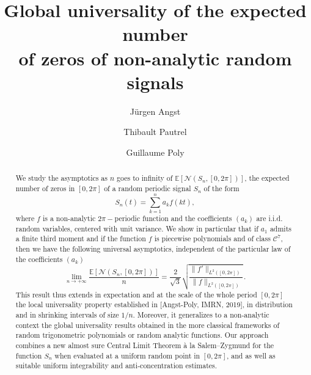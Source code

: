 \documentclass{svproc}
\newcommand \Esp {\mathbb{E}}
\begin{document}
\mainmatter              %
%
\title{Global universality of the expected number \\of zeros of non-analytic random signals}
%
%
\author{Jürgen Angst \and Thibault Pautrel \and Guillaume Poly}
%
%
%

\maketitle              %

\begin{abstract}
We study the asymptotics as $n$ goes to infinity of $\mathbb E\left[\mathcal{N}(S_n,[0,2\pi])\right]$, the expected number of zeros in $[0, 2\pi]$  of a random periodic signal $S_n$ of the form 
\[
S_n(t)=\sum_{k=1}^{n}a_k f(kt),
\]
where $f$ is a non-analytic $2\pi-$periodic function and the coefficients $(a_k)$ are i.i.d. random variables, centered with unit variance. We show in particular that if $a_1$ admits a finite third moment and if the function $f$ is piecewise polynomials and of class $\mathcal C^{7}$, then we have the following universal asymptotics, independent of the particular law of the coefficients $(a_k)$
\[
\lim_{n \to +\infty}\frac{\Esp\left[\mathcal{N}(S_n,[0,2\pi])\right]}{n}= \frac{2}{\sqrt{3}}\sqrt{\frac{\|f'\|_{L^2([0,2\pi])}}{\|f\|_{L^2([0,2\pi])}}}.
\]
This result thus extends in expectation and at the scale of the whole period $[0,2\pi]$ the local universality property  established {in [Angst-Poly, IMRN, 2019]}, in distribution and in shrinking intervals of size $1/n$.  Moreover, it generalizes to a non-analytic context the global universality results obtained in the more classical frameworks of random trigonometric polynomials or random analytic functions. Our approach combines a new almost sure Central Limit Theorem \`a la Salem--Zygmund for the function $S_n$ when evaluated at a uniform random point in $[0, 2\pi]$, and as well as suitable uniform integrability and anti-concentration estimates.

\end{abstract}
%
\end{document}
